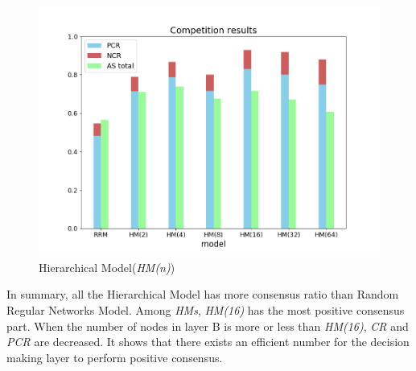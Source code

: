 \documentclass[english]{cccconf}
\begin{document}
\begin{figure}[!htb]
	\centering
	\includegraphics[width=\hsize]{FIG4.png}
	\caption{Hierarchical Model(\textit{HM(n)})}
	\label{Fig4}
\end{figure}

In summary, all the Hierarchical Model has more consensus ratio than Random Regular Networks Model. Among \textit{HMs}, \textit{HM(16)} has the most positive consensus part. When the number of nodes in layer B is more or less than \textit{HM(16)}, \textit{CR} and \textit{PCR} are decreased. It shows that there exists an efficient number for the decision making layer to perform positive consensus.  
\end{document}
